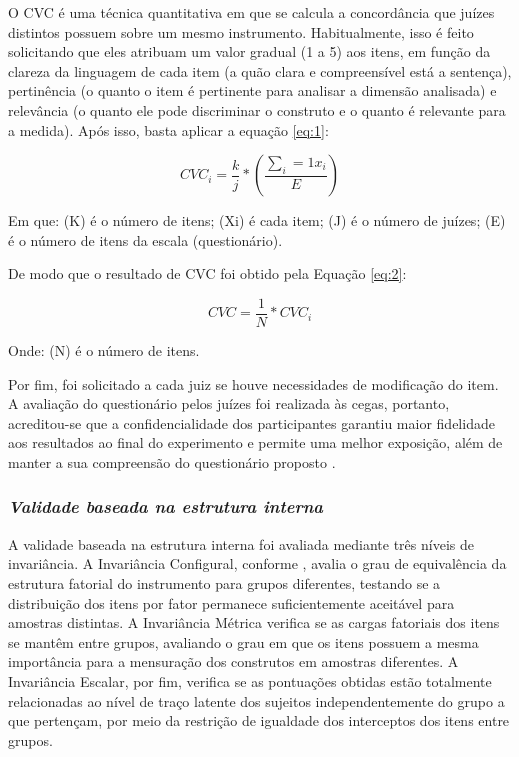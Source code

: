 O CVC é uma técnica quantitativa em que se calcula a concordância que juízes distintos possuem sobre um mesmo instrumento. Habitualmente, isso é feito solicitando que eles atribuam um valor gradual (1 a 5) aos itens, em função da clareza da linguagem de cada item (a quão clara e compreensível está a sentença), pertinência (o quanto o item é pertinente para analisar a dimensão analisada) e relevância (o quanto ele pode discriminar o construto e o quanto é relevante para a medida).  Após isso, basta aplicar a equação \ref{eq:1}:

\begin{equation}
CVC_{i}=\frac{k}{j}*\left (\frac{\sum_{i}=1x_{i}}{E}\right)
\label{eq:1}
\end{equation}

Em que: (K) é o número de itens; (Xi) é cada item; (J) é o número de juízes; (E) é o número de itens da escala (questionário).

De modo que o resultado de CVC foi obtido pela Equação \ref{eq:2}:

\begin{equation}
CVC=\frac{1}{N}*CVC_{i}
\label{eq:2} 
\end{equation}

Onde: (N) é o número de itens.

Por fim, foi solicitado a cada juiz se houve necessidades de modificação do item. A avaliação do questionário pelos juízes foi realizada às cegas, portanto, acreditou-se que a confidencialidade dos participantes garantiu maior fidelidade aos resultados ao final do experimento e permite uma melhor exposição, além de manter a sua compreensão do questionário proposto \cite{Hasson2000}.

\subsubsection{\textit{Validade baseada na estrutura interna}}

A validade baseada na estrutura interna foi avaliada mediante três níveis de invariância. A Invariância Configural, conforme , avalia o grau de equivalência da estrutura fatorial do instrumento para grupos diferentes, testando se a distribuição dos itens por fator permanece suficientemente aceitável para amostras distintas. A Invariância Métrica verifica se as cargas fatoriais dos itens se mantêm entre grupos, avaliando o grau em que os itens possuem a mesma importância para a mensuração dos construtos em amostras diferentes. A Invariância Escalar, por fim, verifica se as pontuações obtidas estão totalmente relacionadas ao nível de traço latente dos sujeitos independentemente do grupo a que pertençam, por meio da restrição de igualdade dos interceptos dos itens entre grupos.


